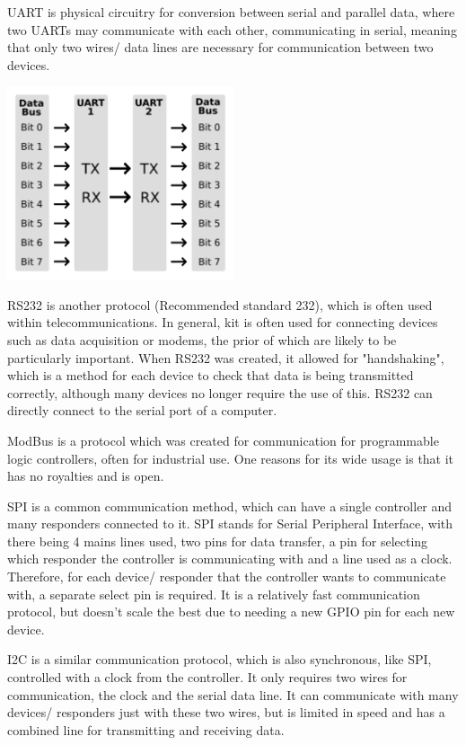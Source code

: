 \documentclass[a4paper,11pt]{report}
\begin{document}
UART is physical circuitry for conversion between serial and parallel data, where two UARTs may communicate with each other, communicating in serial, meaning that only two wires/ data lines are necessary for communication between two devices.

\includegraphics[width=0.5\textwidth]{UART}

RS232 is another protocol (Recommended standard 232), which is often used within telecommunications. In general, kit is often used for connecting devices such as data acquisition or modems, the prior of which are likely to be particularly important. When RS232 was created, it allowed for "handshaking", which is a method for each device to check that data is being transmitted correctly, although many devices no longer require the use of this. RS232 can directly connect to the serial port of a computer.

ModBus is a protocol which was created for communication for programmable logic controllers, often for industrial use. One reasons for its wide usage is that it has no royalties and is open.

SPI is a common communication method, which can have a single controller and many responders connected to it. SPI stands for Serial Peripheral Interface, with there being 4 mains lines used, two pins for data transfer, a pin for selecting which responder the controller is communicating with and a line used as a clock. Therefore, for each device/ responder that the controller wants to communicate with, a separate select pin is required. It is a relatively fast communication protocol, but doesn't scale the best due to needing a new GPIO pin for each new device.

I2C is a similar communication protocol, which is also synchronous, like SPI, controlled with a clock from the controller. It only requires two wires for communication, the clock and the serial data line. It can communicate with many devices/ responders just with these two wires, but is limited in speed and has a combined line for transmitting and receiving data.
\end{document}
